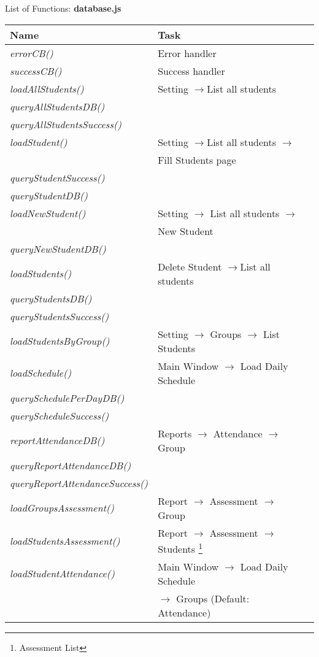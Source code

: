 \begin{bclogo}[couleur=orange!30,logo=\bcbook, arrondi=0.1,ombre=true ] 
{List of Functions: {\bf database.js}}	
\begin{tabular}{lll}
Name                    & Task            \\
\hline
\emph{ errorCB() }                         & Error handler  \\
\emph{ successCB()            }           &  Success handler  \\

\emph{ loadAllStudents()}         &         Setting $\rightarrow $List all students \\
\emph{ queryAllStudentsDB() }             & \\
\emph{ queryAllStudentsSuccess()}         &  \\

\emph{ loadStudent()  }                  & Setting  $\rightarrow $List all students  $\rightarrow $ \\
              & Fill Students page\\
\emph{ queryStudentSuccess() }            &  \\
\emph{ queryStudentDB() }                 &  \\
\emph { loadNewStudent()   }     & {Setting $\rightarrow$ List all students $\rightarrow$ } \\
    &   New Student \\
\emph{ queryNewStudentDB() }              &  \\
\emph{ loadStudents()  }                  & Delete Student $\rightarrow $List all students \\
\emph{ queryStudentsDB() }                &  \\
\emph{ queryStudentsSuccess() }           &   \\
\emph { loadStudentsByGroup()}          & { Setting  $\rightarrow$ Groups $\rightarrow$  List Students  } \\
\emph{ loadSchedule() }       & { Main Window $\rightarrow$ Load Daily Schedule } \\
\emph{ querySchedulePerDayDB() }         &  \\
\emph{ queryScheduleSuccess() }          &  \\
\emph{ reportAttendanceDB()  }              & {  Reports $\rightarrow$  Attendance $\rightarrow$  Group }\\
\emph{ queryReportAttendanceDB() }          &  \\
\emph{ queryReportAttendanceSuccess()}     &  \\
\emph{ loadGroupsAssessment() }            & Report $\rightarrow$ Assessment $\rightarrow$  Group\\
\emph{ loadStudentsAssessment() }      & Report $\rightarrow$ Assessment $\rightarrow$   Students \footnote{Assessment List}\\
\emph{ loadStudentAttendance()  }      &  Main Window $\rightarrow$ Load Daily Schedule  \\
                            &   $\rightarrow$ Groups (Default: Attendance)   \\


\end{tabular}
\end{bclogo}
